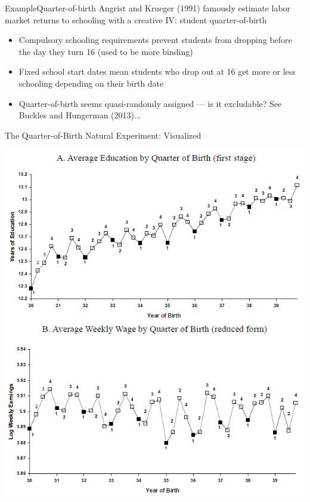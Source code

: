 \documentclass{beamer}
\begin{document}
\begin{frame}{Example}{Quarter-of-birth}
Angrist and Krueger (1991) famously estimate labor market returns to schooling with a creative IV: student quarter-of-birth

\begin{itemize}
  \item Compulsory schooling requirements prevent students from dropping before the day they turn 16 (used to be more binding)

  \item Fixed school start dates mean students who drop out at 16 get more or less schooling depending on their birth date\pause

  \item Quarter-of-birth seems quasi-randomly assigned --- is it excludable? See Buckles and Hungerman (2013)...
\end{itemize}
\end{frame}

\begin{frame}{The Quarter-of-Birth Natural Experiment: Visualized}

\vspace{-0.3cm}
\begin{center}
\includegraphics[scale=0.45]{./lecture_includes/qob1.png}
\end{center}

\end{frame}
\end{document}
